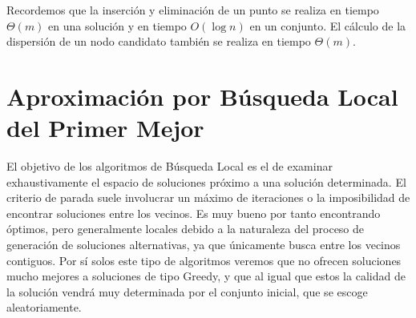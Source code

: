 Recordemos que la inserción y eliminación de un punto se realiza en tiempo $ \Theta (m) $ en una solución
y en tiempo $ O (\log n) $ en un conjunto. El cálculo de la dispersión de un nodo candidato también se realiza
en tiempo $ \Theta (m) $.

\section{Aproximación por Búsqueda Local del Primer Mejor}

El objetivo de los algoritmos de Búsqueda Local es el de examinar exhaustivamente el espacio de soluciones próximo
a una solución determinada. El criterio de parada suele involucrar un máximo de iteraciones o la imposibilidad de encontrar
soluciones entre los vecinos. Es muy bueno por tanto encontrando óptimos, pero generalmente locales debido a la naturaleza del proceso
de generación de soluciones alternativas, ya que únicamente busca entre los vecinos contiguos. Por sí solos este tipo de
algoritmos veremos que no ofrecen soluciones mucho mejores a soluciones de tipo Greedy, y que al igual que estos la
calidad de la solución vendrá muy determinada por el conjunto inicial, que se escoge aleatoriamente.

